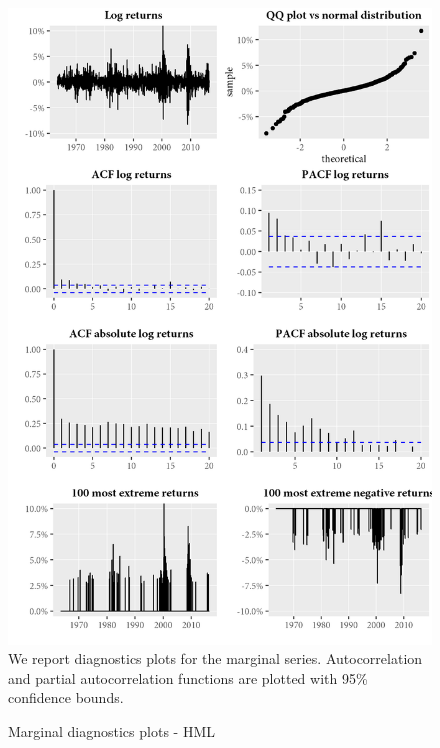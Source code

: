 \begin{figure}[H]
  \caption{Marginal diagnostics plots - HML}
  \label{diag:marginaldiagHML}
  \toprule
  \centering
  \begin{minipage}{\textwidth}
  \includegraphics[scale=1]{graphics/marginal/MarginalStats.HML.Estim.png}  
  \bottomrule
  \vspace{3mm}
  \footnotesize
  We report diagnostics plots for the marginal series. Autocorrelation and partial autocorrelation functions are plotted with 95\% confidence bounds. 
  \end{minipage}
\end{figure}
